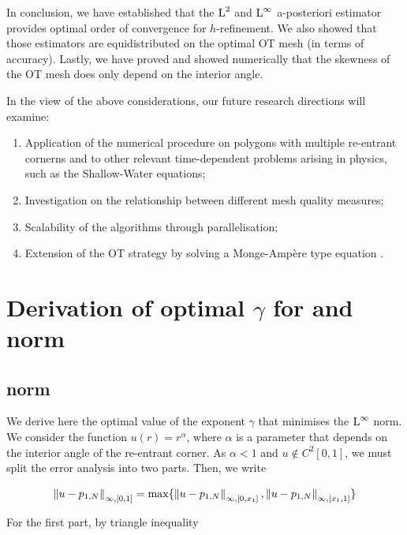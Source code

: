 \documentclass[a4paper,11pt]{article}
\begin{document}
{In conclusion, we have established that the $\operatorname L^{2}$ and $\operatorname L^{\infty}$ a-posteriori estimator provides optimal order of convergence for $h$-refinement. We also showed that those estimators are equidistributed on the optimal OT mesh (in terms of accuracy). Lastly, we have proved and showed numerically that the skewness of the OT mesh does only depend on the interior angle.

In the view of the above considerations, our future research directions  will examine:

\begin{enumerate}
\item Application of the numerical procedure on polygons with multiple re-entrant cornerns and to other relevant time-dependent problems arising in physics, such as the Shallow-Water equations;
\item Investigation on the relationship between different mesh quality measures;
\item Scalability of the algorithms through parallelisation;
\item Extension of the OT strategy by solving a Monge-Ampère type equation \cite{BRW:2015}. 
\end{enumerate}

\printbibliography

\clearpage
\newpage

\appendix

\section{Derivation of optimal $\gamma$ for \leb{\infty} and  norm}

\subsection{\leb{\infty} norm}

We derive here the optimal value of the exponent $\gamma$ that minimises the $\operatorname L^{\infty}$ norm. We consider the function $u(r) = r^{\alpha}$, where $\alpha$ is a parameter that depends on the interior angle of the re-entrant corner. 
As $\alpha < 1$ and $u \not\in C^{2}[0,1]$, we must split the error analysis into two parts. Then, we write 

$$\left\|u - p_{1,N}\right\|_{\infty,[0,1]} = \max \{ \left\|u - p_{1,N}\right\|_{\infty,[0,x_{1}]}, \left\|u - p_{1,N}\right\|_{\infty,[x_{1},1]}\}$$

For the first part, by triangle inequality

}
\end{document}
